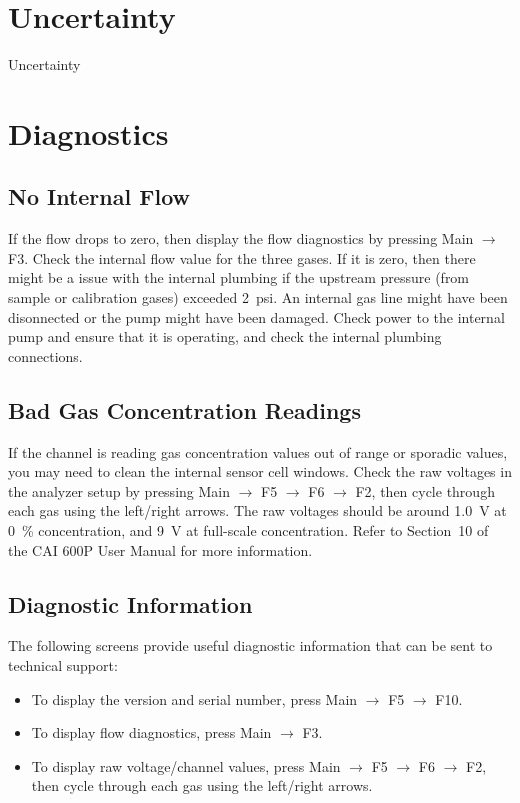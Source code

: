 \documentclass[11pt,oneside]{book}
\begin{document}
\section{Uncertainty}

Uncertainty

\section{Diagnostics}

\subsection{No Internal Flow}

If the flow drops to zero, then display the flow diagnostics by pressing Main $\rightarrow$ F3. Check the internal flow value for the three gases. If it is zero, then there might be a issue with the internal plumbing if the upstream pressure (from sample or calibration gases) exceeded 2~psi. An internal gas line might have been disonnected or the pump might have been damaged. Check power to the internal pump and ensure that it is operating, and check the internal plumbing connections.

\subsection{Bad Gas Concentration Readings}

If the channel is reading gas concentration values out of range or sporadic values, you may need to clean the internal sensor cell windows. Check the raw voltages in the analyzer setup by pressing Main $\rightarrow$ F5 $\rightarrow$ F6 $\rightarrow$ F2, then cycle through each gas using the left/right arrows. The raw voltages should be around 1.0~V at 0~\% concentration, and 9~V at full-scale concentration. Refer to Section~10 of the CAI 600P User Manual for more information.

\subsection{Diagnostic Information}

The following screens provide useful diagnostic information that can be sent to technical support:
\begin{itemize}
\item To display the version and serial number, press Main $\rightarrow$ F5 $\rightarrow$ F10.
\item To display flow diagnostics, press Main $\rightarrow$ F3.
\item To display raw voltage/channel values, press Main $\rightarrow$ F5 $\rightarrow$ F6 $\rightarrow$ F2, then cycle through each gas using the left/right arrows.
\end{itemize}
\end{document}
